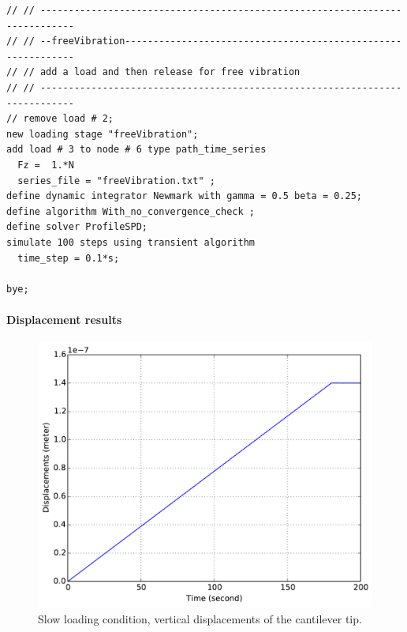 \documentclass[fleqn,11pt]{article}
\begin{document}
\begin{lstlisting}
// // ----------------------------------------------------------------------------
// // --freeVibration-------------------------------------------------------------
// // add a load and then release for free vibration
// // ----------------------------------------------------------------------------
// remove load # 2;
new loading stage "freeVibration";
add load # 3 to node # 6 type path_time_series 
  Fz =  1.*N
  series_file = "freeVibration.txt" ;
define dynamic integrator Newmark with gamma = 0.5 beta = 0.25;
define algorithm With_no_convergence_check ;
define solver ProfileSPD;
simulate 100 steps using transient algorithm 
  time_step = 0.1*s;

bye;
\end{lstlisting}

\paragraph{Displacement results} 

\begin{figure}[!htb]
  \centering
  \includegraphics[width=12cm]{../Figure-files/_Chapter_Appendix_Illustrative_Examples/beam-5element-slowLoading.pdf}
  \caption{Slow loading condition, vertical displacements of the cantilever tip.}
  \label{fig_beam5_slow}
\end{figure}
\end{document}
